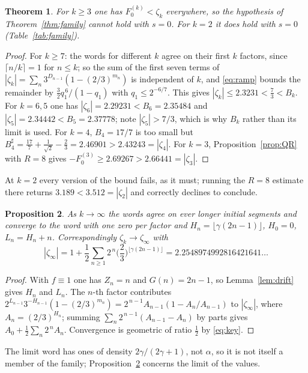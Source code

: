\documentclass[11pt,a4paper]{article}
\theoremstyle{plain}
\newtheorem{theorem}{Theorem}
\newtheorem{proposition}[theorem]{Proposition}
\theoremstyle{definition}
\newcommand{\al}{\alpha}
\newcommand{\ga}{\gamma}
\begin{document}
\begin{theorem}\label{thm:s0}
For $k\ge3$ one has $F^{(k)}_0<\zeta_k$ everywhere, so the hypothesis of
Theorem~\ref{thm:family} cannot hold with $s=0$. For $k=2$ it does hold with $s=0$
(Table~\ref{tab:family}).
\end{theorem}

\begin{proof}
For $k\ge7$: the words for different $k$ agree on their first $k$ factors, since
$\lceil n/k\rceil=1$ for $n\le k$; so the sum of the first seven terms of
$|\zeta_k|=\sum_n3^{D_{n-1}}(1-(2/3)^{m_n})$ is independent of $k$, and \eqref{eq:ramp} bounds the
remainder by $\tfrac32q_1^{\,6}/(1-q_1)$ with $q_1\le2^{-6/7}$. This gives
$|\zeta_k|\le2.3231<\tfrac73<B_k$. For $k=6,5$ one has $|\zeta_6|=2.29231<B_6=2.35484$ and
$|\zeta_5|=2.34442<B_5=2.37778$; note $|\zeta_5|>7/3$, which is why $B_k$ rather than its limit is
used. For $k=4$, $B_4=17/7$ is too small but
$B_4^{\sharp}=\tfrac{17}7+\tfrac1{\sqrt2}-\tfrac23=2.46901>2.43243=|\zeta_4|$. For $k=3$,
Proposition~\ref{prop:QR} with $R=8$ gives $-F^{(3)}_0\ge2.69267>2.66441=|\zeta_3|$.
\end{proof}

At $k=2$ every version of the bound fails, as it must; running the $R=8$ estimate there returns
$3.189<3.512=|\zeta_2|$ and correctly declines to conclude.

\begin{proposition}\label{prop:limit}
As $k\to\infty$ the words agree on ever longer initial segments and converge to the word with one
zero per factor and $H_n=\lfloor\ga(2n-1)\rfloor$, $H_0=0$, $L_n=H_n+n$. Correspondingly
$\zeta_k\to\zeta_\infty$ with
\[
   |\zeta_\infty|=1+\frac12\sum_{n\ge1}2^{\,n}\Big(\frac23\Big)^{\lfloor\ga(2n-1)\rfloor}
   =2.2548974992816421641\ldots
\]
\end{proposition}

\begin{proof}
With $f\equiv1$ one has $Z_n=n$ and $G(n)=2n-1$, so Lemma~\ref{lem:drift} gives $H_n$ and $L_n$. The
$n$-th factor contributes $2^{L_{n-1}}3^{-H_{n-1}}(1-(2/3)^{m_n})=2^{\,n-1}A_{n-1}(1-A_n/A_{n-1})$
to $|\zeta_\infty|$, where $A_n=(2/3)^{H_n}$; summing $\sum_n2^{\,n-1}(A_{n-1}-A_n)$ by parts gives
$A_0+\tfrac12\sum_n2^{\,n}A_n$. Convergence is geometric of ratio $\tfrac12$ by \eqref{eq:key}.
\end{proof}

The limit word has ones of density $2\ga/(2\ga+1)$, not $\al$, so it is not itself a member of the
family; Proposition~\ref{prop:limit} concerns the limit of the values.
\end{document}

